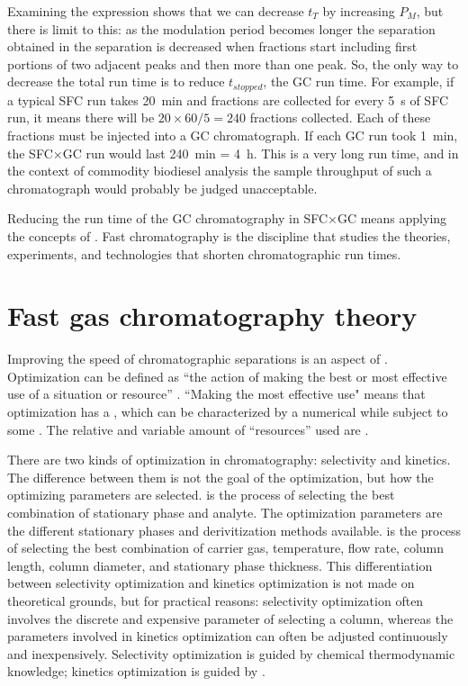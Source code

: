 Examining the expression shows that we can decrease \(t_T\) by increasing
\(P_M\), but there is limit to this: as the modulation period becomes longer the
separation obtained in the \oneD separation is decreased when fractions start
including first portions of two adjacent peaks and then more than one peak. So,
the only way to decrease the total run time is to reduce \(t_{stopped}\), the
GC run time. For example, if a typical SFC run takes \SI{20}{\minute} and fractions are
collected for every \SI{5}{\second} of SFC run, it means there will be \( 20
\times 60 / 5 = 240 \) fractions collected. Each of these fractions must be
injected into a GC chromatograph. If each GC run took \SI{1}{\minute}, the
SFC×GC run would last \SI{240}{\minute} = \SI{4}{\hour}. This is a very long run
time, and in the context of commodity biodiesel analysis the sample throughput
of such a chromatograph would probably be judged unacceptable.

Reducing the run time of the \twoD GC chromatography in SFC×GC means applying
the concepts of . Fast chromatography is the
discipline that studies the theories, experiments, and technologies that shorten
chromatographic run times.

\section{Fast gas chromatography theory}

Improving the speed of chromatographic separations is an aspect of
. Optimization can be defined as ``the action of making
the best or most effective use of a situation or resource'' \autocite{OUP2019}.
``Making the most effective use" means that optimization has a
, which can be characterized by a numerical 
while subject to some . The relative and variable amount
of ``resources'' used are .

There are two kinds of optimization in chromatography: selectivity and kinetics.
The difference between them is not the goal of the optimization, but how the
optimizing parameters are selected.  is the
process of selecting the best combination of stationary phase and analyte. The
optimization parameters are the different stationary phases and derivitization
methods available.  is the process of selecting
the best combination of carrier gas, temperature, flow rate, column length,
column diameter, and stationary phase thickness. This differentiation between
selectivity optimization and kinetics optimization is not made on theoretical
grounds, but for practical reasons: selectivity optimization often involves the
discrete and expensive parameter of selecting a column, whereas the parameters
involved in kinetics optimization can often be adjusted continuously and
inexpensively. Selectivity optimization is guided by chemical thermodynamic
knowledge; kinetics optimization is guided by .

